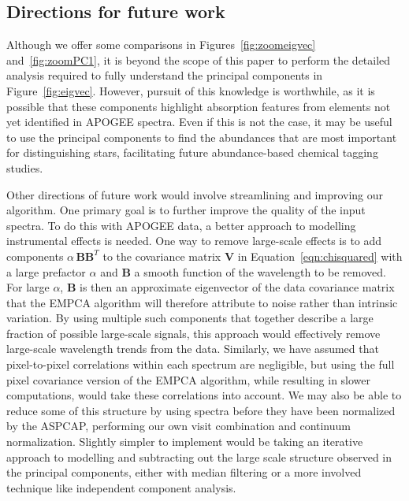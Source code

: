 \documentclass[a4paper,fleqn,usenatbib]{mnras}
\begin{document}
\subsection{Directions for future work}

Although we offer some comparisons in Figures~\ref{fig:zoomeigvec} and~\ref{fig:zoomPC1}, it is beyond the scope of this paper to perform the detailed analysis required to fully understand the principal components in Figure~\ref{fig:eigvec}. However, pursuit of this knowledge is worthwhile, as it is possible that these components highlight absorption features from elements not yet identified in APOGEE spectra. Even if this is not the case, it may be useful to use the principal components to find the abundances that are most important for distinguishing stars, facilitating future abundance-based chemical tagging studies.



Other directions of future work would involve streamlining and improving our algorithm.  One primary goal is to further improve the quality of the input spectra. To do this with APOGEE data, a better approach to modelling instrumental effects is needed. One way to remove large-scale effects is to add components $\alpha\,\mathbf{BB}^T$ to the covariance matrix $\mathbf{V}$ in Equation~\eqref{eqn:chisquared} with a large prefactor $\alpha$ and $\mathbf{B}$ a smooth function of the wavelength to be removed. For large $\alpha$, $\textbf{B}$ is then an approximate eigenvector of the data covariance matrix that the EMPCA algorithm will therefore attribute to noise rather than intrinsic variation. By using multiple such components that together describe a large fraction of possible large-scale signals, this approach would effectively remove large-scale wavelength trends from the data. Similarly, we have assumed that pixel-to-pixel correlations within each spectrum are negligible, but using the full pixel covariance version of the EMPCA algorithm, while resulting in slower computations, would take these correlations into account. We may also be able to reduce some of this structure by using spectra before they have been normalized by the ASPCAP, performing our own visit combination and continuum normalization. Slightly simpler to implement would be taking an iterative approach to modelling and subtracting out the large scale structure observed in the principal components, either with median filtering or a more involved  technique like independent component analysis.  
\end{document}
